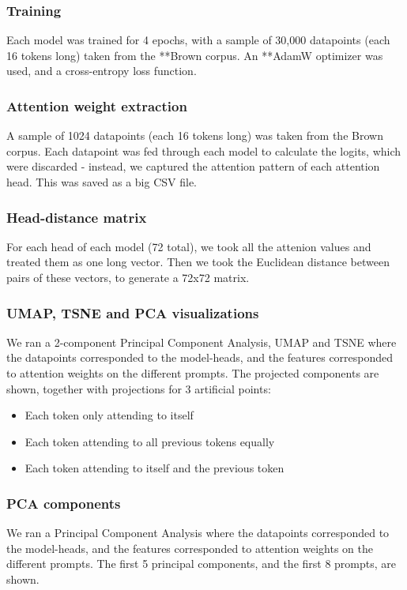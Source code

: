 \documentclass{article}
\begin{document}
\subsubsection{Training}
Each model was trained for 4 epochs, with a sample of 30,000 datapoints (each 16 tokens long) taken from the **Brown corpus. An **AdamW optimizer was used, and a cross-entropy loss function.

\subsubsection{Attention weight extraction}
A sample of 1024 datapoints (each 16 tokens long) was taken from the Brown corpus. Each datapoint was fed through each model to calculate the logits, which were discarded - instead, we captured the attention pattern of each attention head. This was saved as a big CSV file.

\subsubsection{Head-distance matrix}
For each head of each model (72 total), we took all the attenion values and treated them as one long vector. Then we took the Euclidean distance between pairs of these vectors, to generate a 72x72 matrix.

\subsubsection{UMAP, TSNE and PCA visualizations}
We ran a 2-component Principal Component Analysis, UMAP and TSNE where the datapoints corresponded to the model-heads, and the features corresponded to attention weights on the different prompts. The projected components are shown, together with projections for 3 artificial points:

\begin{itemize}
	\item Each token only attending to itself
	\item Each token attending to all previous tokens equally
	\item Each token attending to itself and the previous token
\end{itemize}

\subsubsection{PCA components}
We ran a Principal Component Analysis where the datapoints corresponded to the model-heads, and the features corresponded to attention weights on the different prompts. The first 5 principal components, and the first 8 prompts, are shown.
\end{document}
